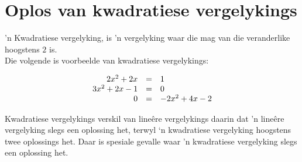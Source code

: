 
\section{Oplos van kwadratiese vergelykings}

’n Kwadratiese vergelyking, is ’n vergelyking waar die mag van die veranderlike hoogstens
$2$ is. \\Die volgende is voorbeelde van kwadratiese vergelykings:\par 


\begin{equation*}
    \begin{array}{ccl}\hfill 2{x}^{2}+2x& =& 1\hfill \\
	\hfill 3{x}^{2}+2x-1&=&0 \\ 
	\hfill 0&=&-2{x}^{2}+4x-2\hfill 
    \end{array}
\end{equation*}

Kwadratiese vergelykings verskil van lineêre vergelykings daarin dat ’n lineêre vergelyking slegs een oplossing
het, terwyl ‘n kwadratiese vergelyking hoogstens twee oplossings het. Daar is spesiale gevalle waar ’n kwadratiese
vergelyking slegs een oplossing het.\par


